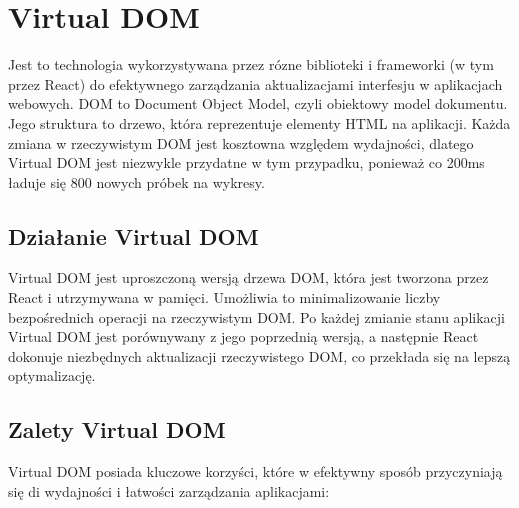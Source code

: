 \section{Virtual DOM}
\label{section:Virtual DOM}

Jest to technologia wykorzystywana przez rózne biblioteki i frameworki (w tym przez React) do efektywnego zarządzania aktualizacjami interfesju w aplikacjach webowych. DOM to Document Object Model, czyli obiektowy model dokumentu. Jego struktura to drzewo, która reprezentuje elementy HTML na aplikacji. Każda zmiana w rzeczywistym DOM jest kosztowna względem wydajności, dlatego Virtual DOM jest niezwykle przydatne w tym przypadku, ponieważ co 200ms ładuje się 800 nowych próbek na wykresy.
\subsection{Działanie Virtual DOM}
Virtual DOM jest uproszczoną wersją drzewa DOM, która jest tworzona przez React i utrzymywana w pamięci. Umożliwia to minimalizowanie liczby bezpośrednich operacji na rzeczywistym DOM. Po każdej zmianie stanu aplikacji Virtual DOM jest porównywany z jego poprzednią wersją, a następnie React dokonuje niezbędnych aktualizacji rzeczywistego DOM, co przekłada się na lepszą optymalizację.

\subsection{Zalety Virtual DOM}
Virtual DOM posiada kluczowe korzyści, które w efektywny sposób przyczyniają się di wydajności i łatwości zarządzania aplikacjami:

